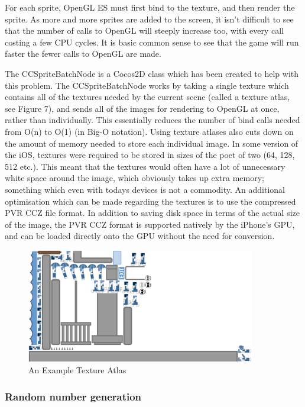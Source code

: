 \documentclass[a4paper,oneside]{report}
\begin{document}
For each sprite, OpenGL ES must first bind to the texture, and then render the sprite. As more and more sprites are added to the screen, it isn't difficult to see that the number of calls to OpenGL will steeply increase too, with every call costing a few CPU cycles. It is basic common sense to see that the game will run faster the fewer calls to OpenGL are made. 

The CCSpriteBatchNode is a Cocos2D class which has been created to help with this problem. The CCSpriteBatchNode works by taking a single texture which contains all of the textures needed by the current scene (called a texture atlas, see Figure 7), and sends all of the images for rendering to OpenGL at once, rather than individually. This essentially reduces the number of bind calls needed from O(n) to O(1) (in Big-O notation). Using texture atlases also cuts down on the amount of memory needed to store each individual image. In some version of the iOS, textures were required to be stored in sizes of the poet of two (64, 128, 512 etc.). This meant that the textures would often have a lot of unnecessary white space around the image, which obviously takes up extra memory; something which even with todays devices is not a commodity. An additional optimisation which can be made regarding the textures is to use the compressed PVR CCZ file format. In addition to saving disk space in terms of the actual size of the image, the PVR CCZ format is supported natively by the iPhone's GPU, and can be loaded directly onto the GPU without the need for conversion.

\begin{figure}[h!]
  \centering
    \includegraphics[width=100mm]{sources/images/Texture_atlas}
    \caption{An Example Texture Atlas}
\end{figure}

\subsubsection{Random number generation} 
\end{document}
